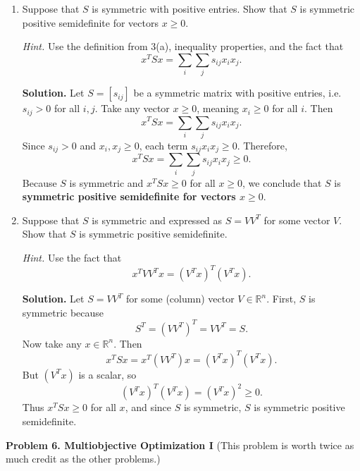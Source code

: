 \documentclass[11pt]{article}
\begin{document}
	\begin{enumerate}[label=\textbf{(\alph*)}, leftmargin=1.2cm]
		\item Suppose that $S$ is symmetric with positive entries. Show that $S$ is symmetric positive semidefinite for vectors $x \ge 0$.
		
		\noindent\textit{Hint.} Use the definition from 3(a), inequality properties, and the fact that
		\[
		x^T S x = \sum_i \sum_j s_{ij} x_i x_j.
		\]
		
		\noindent\textbf{Solution.}
		Let $S = [s_{ij}]$ be a symmetric matrix with positive entries, i.e.\ $s_{ij} > 0$ for all $i,j$.  
		Take any vector $x \ge 0$, meaning $x_i \ge 0$ for all $i$. Then
		\[
		x^T S x = \sum_i \sum_j s_{ij} x_i x_j.
		\]
		Since $s_{ij} > 0$ and $x_i, x_j \ge 0$, each term $s_{ij} x_i x_j \ge 0$.  
		Therefore,
		\[
		x^T S x = \sum_i \sum_j s_{ij} x_i x_j \ge 0.
		\]
		Because $S$ is symmetric and $x^T S x \ge 0$ for all $x \ge 0$,  
		we conclude that $S$ is \textbf{symmetric positive semidefinite for vectors $x \ge 0$}.
		
		\item Suppose that $S$ is symmetric and expressed as $S = V V^T$ for some vector $V$. Show that $S$ is symmetric positive semidefinite.
		
		\noindent\textit{Hint.} Use the fact that
		\[
		x^T V V^T x = (V^T x)^T (V^T x).
		\]
		
		\noindent\textbf{Solution.}
		Let $S = V V^T$ for some (column) vector $V \in \mathbb{R}^n$. First, $S$ is symmetric because
		\[
		S^T = (V V^T)^T = V V^T = S.
		\]
		Now take any $x \in \mathbb{R}^n$. Then
		\[
		x^T S x = x^T (V V^T) x = (V^T x)^T (V^T x).
		\]
		But $(V^T x)$ is a scalar, so
		\[
		(V^T x)^T (V^T x) = (V^T x)^2 \ge 0.
		\]
		Thus $x^T S x \ge 0$ for all $x$, and since $S$ is symmetric, $S$ is symmetric positive semidefinite.
		
	\end{enumerate}
	
	\newpage
	
	\vspace{1.5em}
	\noindent\textbf{Problem 6. Multiobjective Optimization I} \hfill (This problem is worth twice as much credit as the other problems.)
	
\end{document}
